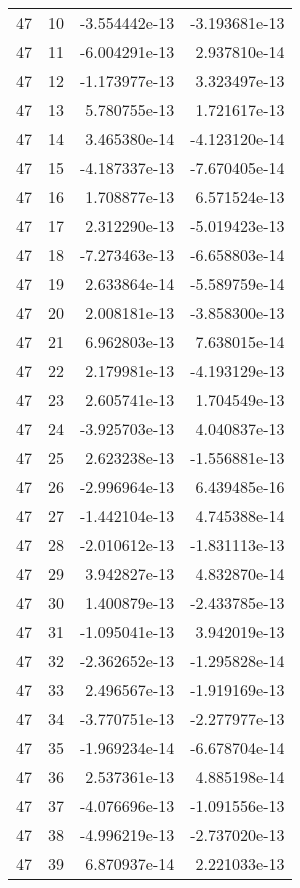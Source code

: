 \begin{tabular}{rrrr}
  47 &   10 & -3.554442e-13 & -3.193681e-13 \\
  47 &   11 & -6.004291e-13 &  2.937810e-14 \\
  47 &   12 & -1.173977e-13 &  3.323497e-13 \\
  47 &   13 &  5.780755e-13 &  1.721617e-13 \\
  47 &   14 &  3.465380e-14 & -4.123120e-14 \\
  47 &   15 & -4.187337e-13 & -7.670405e-14 \\
  47 &   16 &  1.708877e-13 &  6.571524e-13 \\
  47 &   17 &  2.312290e-13 & -5.019423e-13 \\
  47 &   18 & -7.273463e-13 & -6.658803e-14 \\
  47 &   19 &  2.633864e-14 & -5.589759e-14 \\
  47 &   20 &  2.008181e-13 & -3.858300e-13 \\
  47 &   21 &  6.962803e-13 &  7.638015e-14 \\
  47 &   22 &  2.179981e-13 & -4.193129e-13 \\
  47 &   23 &  2.605741e-13 &  1.704549e-13 \\
  47 &   24 & -3.925703e-13 &  4.040837e-13 \\
  47 &   25 &  2.623238e-13 & -1.556881e-13 \\
  47 &   26 & -2.996964e-13 &  6.439485e-16 \\
  47 &   27 & -1.442104e-13 &  4.745388e-14 \\
  47 &   28 & -2.010612e-13 & -1.831113e-13 \\
  47 &   29 &  3.942827e-13 &  4.832870e-14 \\
  47 &   30 &  1.400879e-13 & -2.433785e-13 \\
  47 &   31 & -1.095041e-13 &  3.942019e-13 \\
  47 &   32 & -2.362652e-13 & -1.295828e-14 \\
  47 &   33 &  2.496567e-13 & -1.919169e-13 \\
  47 &   34 & -3.770751e-13 & -2.277977e-13 \\
  47 &   35 & -1.969234e-14 & -6.678704e-14 \\
  47 &   36 &  2.537361e-13 &  4.885198e-14 \\
  47 &   37 & -4.076696e-13 & -1.091556e-13 \\
  47 &   38 & -4.996219e-13 & -2.737020e-13 \\
  47 &   39 &  6.870937e-14 &  2.221033e-13 \\

\end{tabular}
